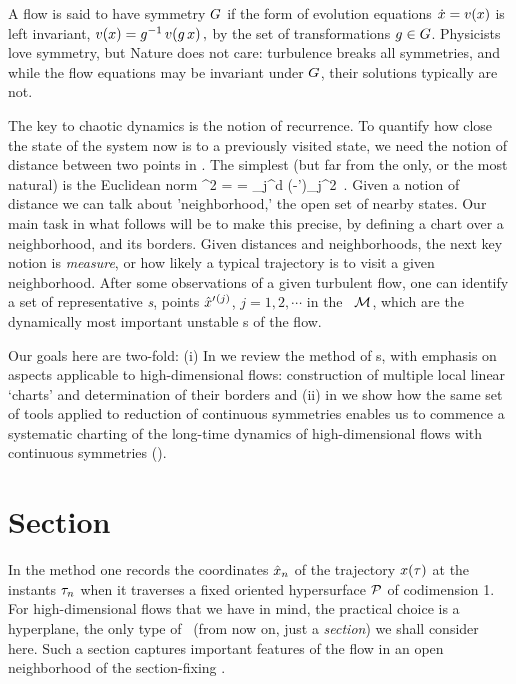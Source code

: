 \documentclass[aip,cha,reprint,
secnumarabic,
nofootinbib, tightenlines,
nobibnotes, showkeys, showpacs,
groupedaddress
]{revtex4-1}
\begin{document}
A flow is said to have symmetry $G$ if the form of evolution
equations $\dot{x} = v(x)$ is left invariant,
\(
v(x)=g^{-1} \, v(g \, x)
\,,
\) %
by the set of transformations $g \in {\ensuremath{G}}$. Physicists love
symmetry, but Nature does not care: turbulence breaks all symmetries,
and while the flow equations may be invariant under $G$, their
solutions typically are not.

The key to chaotic dynamics is the notion of recurrence. To quantify how
close the state of the system now is to a previously visited state, we
need the notion of distance between two points in \statesp. The simplest
(but far from the only, or the most natural) is the Euclidean norm
\beq
  ^2  =  =
\sum_j^d
(\ssp-\ssp')_j^2
\,.
Given a notion of distance we can talk about 'neighborhood,' the open set of
nearby states. Our main task in what follows will be to make this precise,
by defining a chart over a neighborhood, and its borders.
Given distances and neighborhoods,
the next key notion is  \emph{measure}, or how likely a typical
trajectory is to visit a given neighborhood. After some observations of a
given turbulent flow, one can identify a set of representative
\emph{\template s}, {points}
${\hat{x}'}{}^{(j)}$, $j=1,2,\cdots$ in the \statesp\ ${\cal M}$, which are the
dynamically most important unstable {\recurrStr s} of the flow.

Our goals here are two-fold:
(i) In  we review the method of \PoincSec s, with
    emphasis on aspects applicable to high-dimensional flows: construction of
    multiple local linear `charts' and determination of their borders and
(ii) in  we show how the same set of tools applied to
    reduction of continuous symmetries enables us to commence a
    systematic charting of the long-time dynamics of high-dimensional
    flows with continuous symmetries ().


\section{Section}
\label{s:cut}

In the {\em \PoincSec} method one records the coordinates
$\hat{x}_n$ of the trajectory $x(\tau)$ at the instants $\tau_n$
when it traverses a fixed oriented hypersurface ${\cal P}$ of codimension
1. For high-dimensional flows that we have in mind, the practical choice
is a hyperplane, the only type of \PoincSec\ (from now on, just a
\emph{section}) we shall consider here. Such a section captures
important features of the flow in an open neighborhood of the
section-fixing \template.
\end{document}
